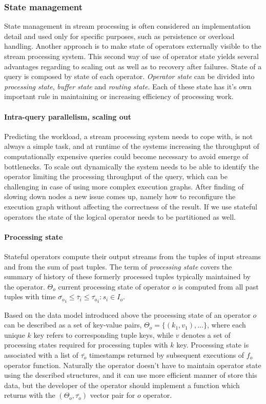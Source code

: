 \subsubsection{State management}
State management in stream processing is often considered an implementation detail and used only for specific purposes, such as persistence or overload handling. Another approach is to make state of operators externally visible to the stream processing system. This second way of use of operator state yields several advantages regarding to scaling out as well as  to recovery after failures.
State of a query is composed by state of each operator. \textit{Operator state} can be divided into \textit{processing state}, \textit{buffer state} and \textit{routing state}. Each of these state has it's own important rule in maintaining or increasing efficiency of processing work.
\paragraph{Intra-query parallelism, scaling out}
Predicting the workload, a stream processing system needs to cope with, is not always a simple task, and at runtime of the systems increasing the throughput of computationally expensive queries could become necessary to avoid emerge of bottlenecks. To scale out dynamically the system needs to be able to identify the operator limiting the processing throughput of the query, which can be challenging in case of using more complex execution graphs. After finding of slowing down nodes a new issue comes up, namely how to reconfigure the execution graph without affecting the correctness of the result. If we use stateful operators the state of the logical operator needs to be partitioned as well.
\paragraph{Processing state}
Stateful operators compute their output streams from the tuples of input streams and from the sum of past tuples.
The term of \textit{processing state} covers the summary of history of these formerly processed tuples  typically maintained by the operator. $\Theta_o$ current processing state of operator $o$ is computed from all past tuples with time $\overline{\sigma_o}_i \leq \overline{\tau}_i \leq \overline{\tau_o}_i : s_i \in I_o $. 

Based on the data model introduced above the processing state of an operator $o$ can be described as a set of key-value pairs, $\Theta_o=\{ (k_1,v_1),\dots\}$, where each unique $k$ key refers to corresponding tuple keys, while $v$ denotes a set of  processing states required for processing tuples with $k$ key. Processing state is associated with a list of $\overline{\tau_o}$ timestamps returned by subsequent executions of $f_o$ operator function.
Naturally the operator doesn't have to maintain operator state using the described structures, and it can use more efficient manner of store this data, but the developer of the operator should implement a function which returns with the $(\Theta_o,\overline{\tau_o})$ vector pair for $o$ operator. 


